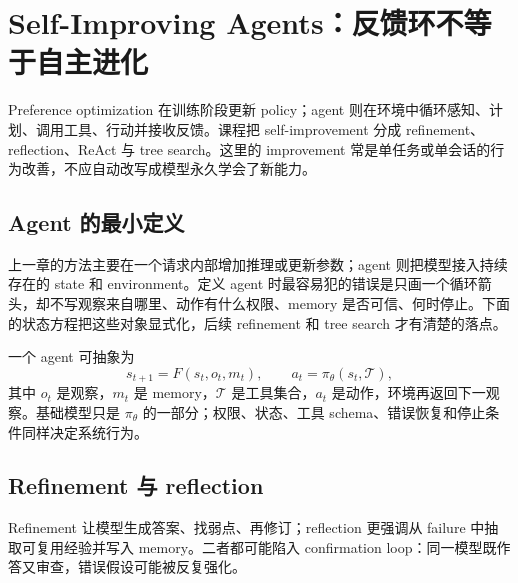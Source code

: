 \section{Self-Improving Agents：反馈环不等于自主进化}

Preference optimization 在训练阶段更新 policy；agent 则在环境中循环感知、计划、调用工具、行动并接收反馈。课程把 self-improvement 分成 refinement、reflection、ReAct 与 tree search。这里的 improvement 常是单任务或单会话的行为改善，不应自动改写成模型永久学会了新能力。

\subsection{Agent 的最小定义}

上一章的方法主要在一个请求内部增加推理或更新参数；agent 则把模型接入持续存在的 state 和 environment。定义 agent 时最容易犯的错误是只画一个循环箭头，却不写观察来自哪里、动作有什么权限、memory 是否可信、何时停止。下面的状态方程把这些对象显式化，后续 refinement 和 tree search 才有清楚的落点。

一个 agent 可抽象为
\[
s_{t+1}=F(s_t,o_t,m_t),\qquad a_t=\pi_{\theta}(s_t,\mathcal{T}),
\]
其中 $o_t$ 是观察，$m_t$ 是 memory，$\mathcal{T}$ 是工具集合，$a_t$ 是动作，环境再返回下一观察。基础模型只是 $\pi_{\theta}$ 的一部分；权限、状态、工具 schema、错误恢复和停止条件同样决定系统行为。




\subsection{Refinement 与 reflection}

Refinement 让模型生成答案、找弱点、再修订；reflection 更强调从 failure 中抽取可复用经验并写入 memory。二者都可能陷入 confirmation loop：同一模型既作答又审查，错误假设可能被反复强化。






